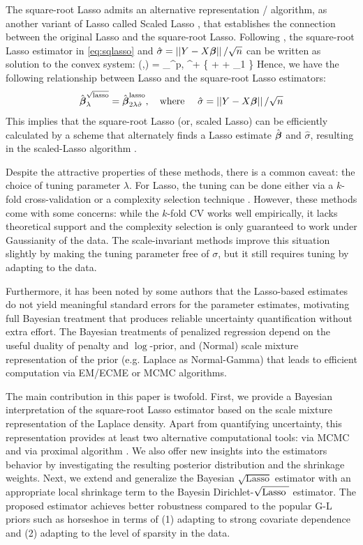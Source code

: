 \documentclass[10pt]{article}
\def\sql{$\sqrt{\text{Lasso}}$}
\def\sqdl{Dirichlet-$\sqrt{\text{\rm{Lasso} }}$}
\begin{document}
The square-root Lasso admits an alternative representation / algorithm, as another variant of Lasso called Scaled Lasso \citep{sun2012scaled}, that establishes the connection between the original Lasso and the square-root Lasso. Following \citet{giraud2014introduction},  the square-root Lasso estimator in \eqref{eq:sqlasso} and $\hat{\sigma} = \left|\left|Y-X\boldsymbol{\beta}\right|\right|/\sqrt{n}$ can be written as solution to the convex system:
\beq
(\hat{\bbeta},\hat{\sigma}) = \argmin_{\bbeta \in \Re^p, \sigma \in \Re^+} \left\{  +  + \lambda \norm{\bbeta}_1 \right\}
\eeq
Hence, we have the following relationship between Lasso and the square-root Lasso estimators:
\[
\hat{\boldsymbol{\beta}}_{\lambda}^{\sqrt{\text{lasso}}} = \hat{\boldsymbol{\beta}}_{2\lambda \hat{\sigma}}^{\text{lasso}}, \quad \text{where } \quad \hat{\sigma} = \left|\left|Y-X\boldsymbol{\beta}\right|\right|/\sqrt{n}
\]
This implies that the square-root Lasso (or, scaled Lasso) can be efficiently calculated by a scheme that alternately finds a Lasso estimate $\hat{\boldsymbol{\beta}}$ and $\hat{\sigma}$, resulting in the scaled-Lasso algorithm \citep{sun2012scaled}.  

Despite the attractive properties of these methods, there is a common caveat: the choice of tuning parameter $\lambda$. For Lasso, the tuning can be done either via a $k$-fold cross-validation or a complexity selection technique \citep{giraud2012high}. However, these methods come with some concerns: while the $k$-fold CV works well empirically, it lacks theoretical support and the complexity selection is only guaranteed to work under Gaussianity of the data. The scale-invariant methods improve this situation slightly by making the tuning parameter free of $\sigma$, but it still requires tuning by adapting to the data. 

Furthermore, it has been noted by some authors \citep{chatterjee2011bootstrap} that the Lasso-based estimates do not yield meaningful standard errors for the parameter estimates, motivating full Bayesian treatment that produces reliable uncertainty quantification without extra effort. The Bayesian treatments of penalized regression depend on the useful duality of penalty and $\log$-prior, and (Normal) scale mixture representation of the prior (e.g. Laplace as Normal-Gamma) that leads to efficient computation via EM/ECME or MCMC algorithms. 

The main contribution in this paper is twofold. First, we provide a Bayesian interpretation of the square-root Lasso estimator based on the scale mixture representation of the Laplace density. Apart from quantifying uncertainty, this representation provides at least two alternative computational tools: via MCMC and via proximal algorithm \citep{polson2015proximal}. We also offer new insights into the estimators behavior by investigating the resulting posterior distribution and the shrinkage weights. Next, we extend and generalize the Bayesian \sql{} estimator with an appropriate local shrinkage term to the Bayesin \sqdl{} estimator. The proposed estimator achieves better robustness compared to the popular G-L priors such as horseshoe in terms of (1) adapting to strong covariate dependence and (2) adapting to the level of sparsity in the data. 
\end{document}
